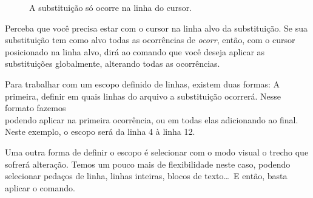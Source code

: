 \begin{figure}
\begin{center}
\caption{A substituição só ocorre na linha do cursor.}
\end{center}
\end{figure}

Perceba que você precisa estar com o cursor na linha alvo da substituição.
Se sua substituição tem como alvo todas as ocorrências de \textit{ocorr}, então,
com o cursor posicionado na linha alvo,  dirá ao comando que
você deseja aplicar as substituições globalmente, alterando todas as ocorrências.

Para trabalhar com um escopo definido de linhas, existem duas formas: A primeira,
definir em quais linhas do arquivo a substituição ocorrerá.
Nesse formato fazemos \\
podendo aplicar na primeira ocorrência, ou em todas elas adicionando  ao final.
Neste exemplo, o escopo será da linha 4 à linha 12.

Uma outra forma de definir o escopo é selecionar com o modo visual o trecho
que sofrerá alteração.
Temos um pouco mais de flexibilidade neste caso, podendo selecionar pedaços de linha,
linhas inteiras,
blocos de texto\ldots\
E então, basta aplicar o comando.

